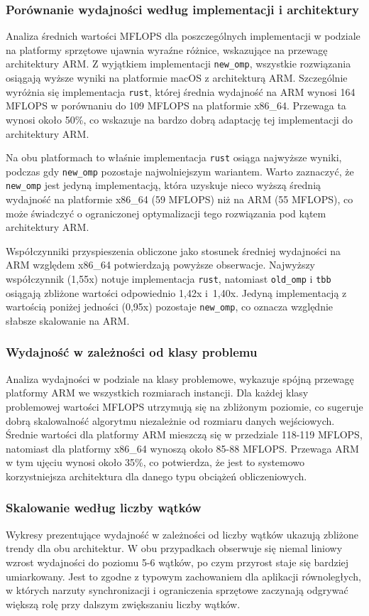 \subsubsection{Porównanie wydajności według implementacji i architektury}
Analiza średnich wartości MFLOPS dla poszczególnych implementacji w podziale na platformy sprzętowe ujawnia wyraźne różnice, wskazujące na przewagę architektury ARM. Z wyjątkiem implementacji \texttt{new\_omp}, wszystkie rozwiązania osiągają wyższe wyniki na platformie macOS z architekturą ARM. Szczególnie wyróżnia się implementacja \texttt{rust}, której średnia wydajność na ARM wynosi 164 MFLOPS w porównaniu do 109 MFLOPS na platformie x86\_64. Przewaga ta wynosi około 50\%, co wskazuje na bardzo dobrą adaptację tej implementacji do architektury ARM.

Na obu platformach to właśnie implementacja \texttt{rust} osiąga najwyższe wyniki, podczas gdy \texttt{new\_omp} pozostaje najwolniejszym wariantem. Warto zaznaczyć, że \texttt{new\_omp} jest jedyną implementacją, która uzyskuje nieco wyższą średnią wydajność na platformie x86\_64 (59 MFLOPS) niż na ARM (55 MFLOPS), co może świadczyć o ograniczonej optymalizacji tego rozwiązania pod kątem architektury ARM.

Współczynniki przyspieszenia obliczone jako stosunek średniej wydajności na ARM względem x86\_64 potwierdzają powyższe obserwacje. Najwyższy współczynnik (1,55x) notuje implementacja \texttt{rust}, natomiast \texttt{old\_omp} i \texttt{tbb} osiągają zbliżone wartości odpowiednio 1,42x i~1,40x. Jedyną implementacją z wartością poniżej jedności (0,95x) pozostaje \texttt{new\_omp}, co oznacza względnie słabsze skalowanie na ARM.

\subsubsection{Wydajność w zależności od klasy problemu}
Analiza wydajności w podziale na klasy problemowe, wykazuje spójną przewagę platformy ARM we wszystkich rozmiarach instancji. Dla każdej klasy problemowej wartości MFLOPS utrzymują się na zbliżonym poziomie, co sugeruje dobrą skalowalność algorytmu niezależnie od rozmiaru danych wejściowych. Średnie wartości dla platformy ARM mieszczą się w przedziale 118-119 MFLOPS, natomiast dla platformy x86\_64 wynoszą około 85-88 MFLOPS. Przewaga ARM w tym ujęciu wynosi około 35\%, co potwierdza, że jest to systemowo korzystniejsza architektura dla danego typu obciążeń obliczeniowych.


\subsubsection{Skalowanie według liczby wątków}
Wykresy prezentujące wydajność w zależności od liczby wątków ukazują zbliżone trendy dla obu architektur. W obu przypadkach obserwuje się niemal liniowy wzrost wydajności do poziomu 5-6 wątków, po czym przyrost staje się bardziej umiarkowany. Jest to zgodne z typowym zachowaniem dla aplikacji równoległych, w których narzuty synchronizacji i ograniczenia sprzętowe zaczynają odgrywać większą rolę przy dalszym zwiększaniu liczby wątków.

